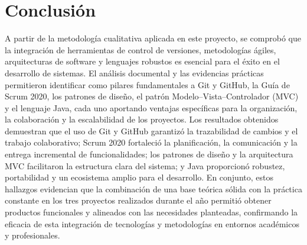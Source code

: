 \section{Conclusión}
A partir de la metodología cualitativa aplicada en este proyecto, se comprobó que la integración de herramientas de control de versiones, metodologías ágiles, arquitecturas de software y lenguajes robustos es esencial para el éxito en el desarrollo de sistemas. El análisis documental y las evidencias prácticas permitieron identificar como pilares fundamentales a Git y GitHub, la Guía de Scrum 2020, los patrones de diseño, el patrón Modelo–Vista–Controlador (MVC) y el lenguaje Java, cada uno aportando ventajas específicas para la organización, la colaboración y la escalabilidad de los proyectos. Los resultados obtenidos demuestran que el uso de Git y GitHub garantizó la trazabilidad de cambios y el trabajo colaborativo; Scrum 2020 fortaleció la planificación, la comunicación y la entrega incremental de funcionalidades; los patrones de diseño y la arquitectura MVC facilitaron la estructura clara del sistema; y Java proporcionó robustez, portabilidad y un ecosistema amplio para el desarrollo. En conjunto, estos hallazgos evidencian que la combinación de una base teórica sólida con la práctica constante en los tres proyectos realizados durante el año permitió obtener productos funcionales y alineados con las necesidades planteadas, confirmando la eficacia de esta integración de tecnologías y metodologías en entornos académicos y profesionales.